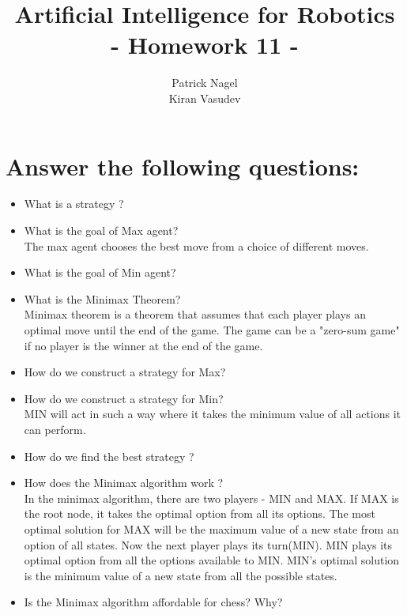\documentclass[11pt]{article}
\title{\textbf{Artificial Intelligence for Robotics\\
- Homework 11} -
}
\author{Patrick Nagel\\Kiran Vasudev}
\date{ }
\begin{document}
\maketitle

\section{Answer the following questions:}
\begin{itemize}
	\item What is a strategy ?\\
	
	\item What is the goal of Max agent?\\
	The max agent chooses the best move from a choice of different moves.
	
	\item What is the goal of Min agent?\\
	
	\item What is the Minimax Theorem?\\
	Minimax theorem is a theorem that assumes that each player plays an optimal move until the end of the game. The game can be a "zero-sum game" if no player is the winner at the end of the game.
	
	\item How do we construct a strategy for Max?\\
	
	\item How do we construct a strategy for Min?\\
	MIN will act in such a way where it takes the minimum value of all actions it can perform.
	
	\item How do we find the best strategy ?\\
	
	\item How does the Minimax algorithm work ?\\
	In the minimax algorithm, there are two players - MIN and MAX. If MAX is the root node, it takes the optimal option from all its options. The most optimal solution for MAX will be the maximum value of a new state from an option of all states. Now the next player plays its turn(MIN). MIN plays its optimal option from all the options available to MIN. MIN's optimal solution is the minimum value of a new state	from all the possible states.
	
	
	\item Is the Minimax algorithm affordable for chess? Why?\\
	

\end{itemize}
\end{document}
